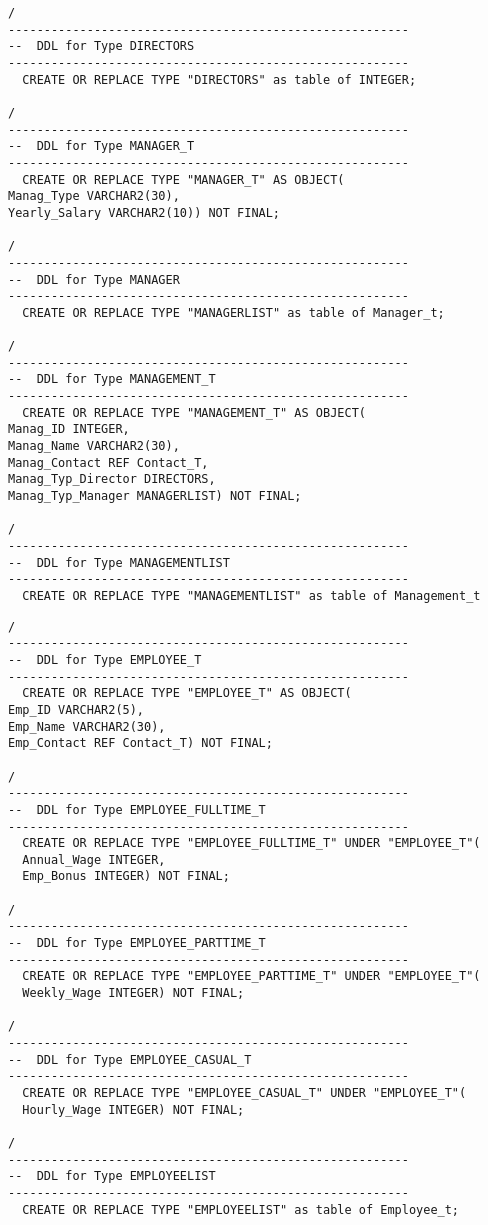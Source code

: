 \documentclass{scrartcl}
\begin{document}
\begin{lstlisting}
/
--------------------------------------------------------
--  DDL for Type DIRECTORS
--------------------------------------------------------
  CREATE OR REPLACE TYPE "DIRECTORS" as table of INTEGER;

/
--------------------------------------------------------
--  DDL for Type MANAGER_T
--------------------------------------------------------
  CREATE OR REPLACE TYPE "MANAGER_T" AS OBJECT(
Manag_Type VARCHAR2(30),
Yearly_Salary VARCHAR2(10)) NOT FINAL;

/
--------------------------------------------------------
--  DDL for Type MANAGER
--------------------------------------------------------
  CREATE OR REPLACE TYPE "MANAGERLIST" as table of Manager_t;

/
--------------------------------------------------------
--  DDL for Type MANAGEMENT_T
--------------------------------------------------------
  CREATE OR REPLACE TYPE "MANAGEMENT_T" AS OBJECT(
Manag_ID INTEGER,
Manag_Name VARCHAR2(30),
Manag_Contact REF Contact_T,
Manag_Typ_Director DIRECTORS,
Manag_Typ_Manager MANAGERLIST) NOT FINAL;

/
--------------------------------------------------------
--  DDL for Type MANAGEMENTLIST
--------------------------------------------------------
  CREATE OR REPLACE TYPE "MANAGEMENTLIST" as table of Management_t
\end{lstlisting}

\begin{lstlisting}
/
--------------------------------------------------------
--  DDL for Type EMPLOYEE_T
--------------------------------------------------------
  CREATE OR REPLACE TYPE "EMPLOYEE_T" AS OBJECT(
Emp_ID VARCHAR2(5),
Emp_Name VARCHAR2(30),
Emp_Contact REF Contact_T) NOT FINAL;

/
--------------------------------------------------------
--  DDL for Type EMPLOYEE_FULLTIME_T
--------------------------------------------------------
  CREATE OR REPLACE TYPE "EMPLOYEE_FULLTIME_T" UNDER "EMPLOYEE_T"(
  Annual_Wage INTEGER,
  Emp_Bonus INTEGER) NOT FINAL;
  
/
--------------------------------------------------------
--  DDL for Type EMPLOYEE_PARTTIME_T
--------------------------------------------------------
  CREATE OR REPLACE TYPE "EMPLOYEE_PARTTIME_T" UNDER "EMPLOYEE_T"(
  Weekly_Wage INTEGER) NOT FINAL;
  
/
--------------------------------------------------------
--  DDL for Type EMPLOYEE_CASUAL_T
--------------------------------------------------------
  CREATE OR REPLACE TYPE "EMPLOYEE_CASUAL_T" UNDER "EMPLOYEE_T"(
  Hourly_Wage INTEGER) NOT FINAL;

/
--------------------------------------------------------
--  DDL for Type EMPLOYEELIST
--------------------------------------------------------
  CREATE OR REPLACE TYPE "EMPLOYEELIST" as table of Employee_t;
\end{lstlisting}
\end{document}
